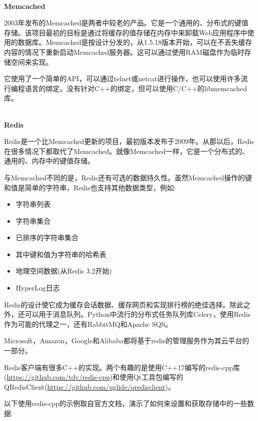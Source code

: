 \hspace*{\fill} \\ %
\noindent
\textbf{Memcached}

2003年发布的Memcached是两者中较老的产品。它是一个通用的、分布式的键值存储。该项目最初的目标是通过将缓存的值存储在内存中来卸载Web应用程序中使用的数据库。Memcached是按设计分发的，从1.5.18版本开始，可以在不丢失缓存内容的情况下重新启动Memcached服务器。这可以通过使用RAM磁盘作为临时存储空间来实现。

它使用了一个简单的API，可以通过telnet或netcat进行操作，也可以使用许多流行编程语言的绑定。没有针对C++的绑定，但可以使用C/C++的libmemcached库。

\hspace*{\fill} \\ %
\noindent
\textbf{Redis}

Redis是一个比Memcached更新的项目，最初版本发布于2009年。从那以后，Redis在很多情况下都取代了Memcached。就像Memcached一样，它是一个分布式的、通用的、内存中的键值存储。

与Memcached不同的是，Redis还有可选的数据持久性。虽然Memcached操作的键和值是简单的字符串，Redis也支持其他数据类型，例如:

\begin{itemize}
\item 
字符串列表

\item 
字符串集合

\item 
已排序的字符串集合

\item 
其中键和值为字符串的哈希表

\item 
地理空间数据(从Redis 3.2开始)

\item 
HyperLog日志
\end{itemize}

Redis的设计使它成为缓存会话数据、缓存网页和实现排行榜的绝佳选择。除此之外，还可以用于消息队列。Python中流行的分布式任务队列库Celery，使用Redis作为可能的代理之一，还有RabbitMQ和Apache SQS。

Microsoft，Amazon，Google和Alibaba都将基于redis的管理服务作为其云平台的一部分。

Redis客户端有很多C++的实现。两个有趣的是使用C++17编写的redis-cpp库(\url{https://github.com/tdv/redis-cpp})和使用Qt工具包编写的QRedisClient(\url{https://github.com/uglide/qredisclient})。

以下使用redis-cpp的示例取自官方文档，演示了如何来设置和获取存储中的一些数据:

